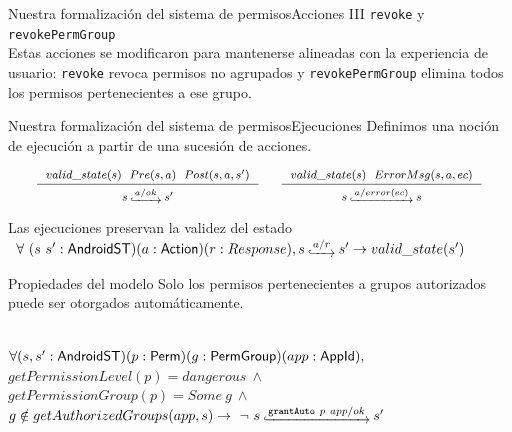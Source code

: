 \documentclass[pdf, handout]{beamer} %
\begin{document}
\begin{frame}{Nuestra formalización del sistema de permisos}{Acciones III}
    \texttt{revoke} y \texttt{revokePermGroup}\\
    \vspace{5px}
    Estas acciones se modificaron para mantenerse alineadas con la experiencia de usuario:
    \texttt{revoke} revoca permisos no agrupados y \texttt{revokePermGroup} elimina todos los
    permisos pertenecientes a ese grupo.\\
\end{frame}


\begin{frame}{Nuestra formalización del sistema de permisos}{Ejecuciones}
    Definimos una noción de ejecución a partir de una sucesión de acciones.

    \begin{displaymath}
        \fontsize{8pt}{9pt}\selectfont
        \begin{array}{c}
            \inference[]{$$valid\_state(s)$$ \hspace{.2cm} $$Pre(s, a)$$ \hspace{.2cm} $$Post(s, a, s')$$}{$$s\step{a/ok}s'$$}
            \hspace{0.5cm}
            \inference[]{$$valid\_state(s)$$ \hspace{.2cm} $$ErrorMsg(s, a, ec)$$}{$$s\step{a/error(ec)}s$$}
        \end{array}
    \end{displaymath}
    \pause
    \begin{theorem}{Las ejecuciones preservan la validez del estado}
        \fontsize{9pt}{12pt}\selectfont
        $\begin{array}{l} \forall\ (s\ s':\AndroidState)(a:\Action) (r:Response), s\step{a/r}s'
                \rightarrow valid\_state(s')\end{array}$
    \end{theorem}
\end{frame}

\begin{frame}{Propiedades del modelo}
    Solo los permisos pertenecientes a grupos autorizados puede ser otorgados automáticamente.
    \pause \vspace{20px}
    \begin{prop} \mbox{} \\
        \fontsize{9pt}{15pt}\selectfont
        $\forall (s,s': \mathsf{AndroidST}) (p:\mathsf{Perm}) (g:\mathsf{PermGroup}) (app:\mathsf{AppId}),$ \\
        $getPermissionLevel(p) = dangerous\ \land$ \\
        $getPermissionGroup(p) = Some\ g\ \land$ \\
        $g \notin getAuthorizedGroups(app,s) \rightarrow\ \neg\ \Mathexecrel{s}{\texttt{grantAuto}~p~app/ok}{s'}$ \\
    \end{prop}
\end{frame}
\end{document}
